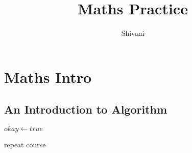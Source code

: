 \documentclass{article}
\begin{document}
\title{Maths Practice}
\author{Shivani}
\maketitle

\section{Maths Intro}

\subsection{An Introduction to Algorithm}

\begin{algorithmic}
    \State $okay \gets true$ 
    
\Else
       \State repeat course
     \EndWhile
\EndIf
\end{algorithmic}
\end{document}
